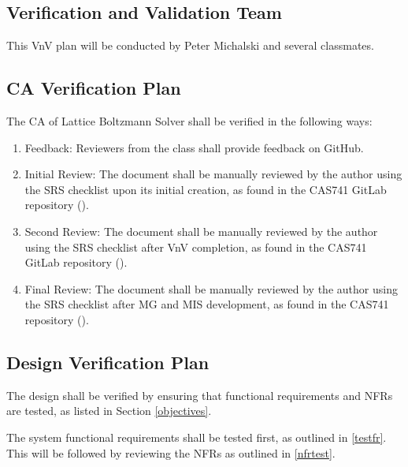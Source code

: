 \documentclass[12pt, titlepage]{article}
\newcommand{\famname}{Lattice Boltzmann Solver}
\begin{document}
\subsection{Verification and Validation Team}

This VnV plan will be conducted by Peter Michalski and several
classmates. 

\subsection{CA Verification Plan}

The CA of {\famname} shall be verified in the following ways:

\begin{enumerate}
\item Feedback: Reviewers from the class shall provide feedback on
  GitHub. 
\item Initial Review: The document shall be manually reviewed by the author
  using the SRS checklist upon its initial creation, as found in the CAS741
  GitLab repository (\citet{CAS741_SRS_checklist}). 
\item Second Review: The document shall be manually reviewed by the author using
  the SRS checklist after VnV completion, as found in the CAS741 GitLab
  repository (\citet{CAS741_SRS_checklist}). 
\item Final Review: The document shall be manually reviewed by the author using
  the SRS checklist after MG and MIS development, as found in the CAS741
  repository (\citet{CAS741_SRS_checklist}). 
\end{enumerate}

\subsection{Design Verification Plan}

The design shall be verified by ensuring that functional requirements and NFRs
are tested, as listed in Section \ref{objectives}.

\noindent The system functional requirements shall be tested first, as outlined
in \ref{testfr}. This will be followed by reviewing the NFRs as outlined in
\ref{nfrtest}.
\end{document}
